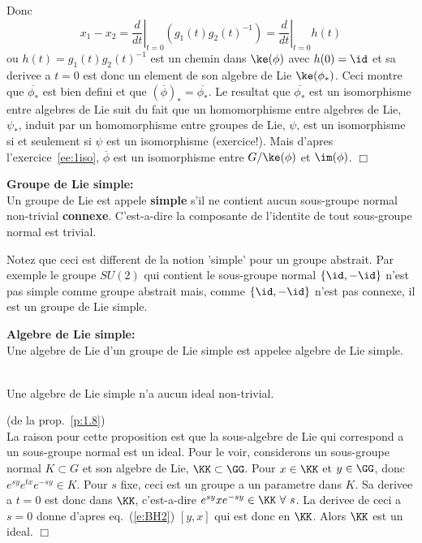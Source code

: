 \begin{prv}
Donc 
$$ x_1-x_2 = \left.\frac{d}{dt}\right|_{t=0}(g_1(t)g_2(t)^{-1}) = \left.\frac{d}{dt}\right|_{t=0}h(t)$$
ou $h(t)=g_1(t)g_2(t)^{-1}$ est un chemin dans $\ke(\phi)$ avec $h(0)=\id$ et sa derivee a $t=0$
est donc un element de son algebre de Lie $\ke(\phi_*)$. Ceci montre que $\overline{\phi_*}$ est bien
defini et que $(\overline\phi)_* = \overline{\phi_*}$. Le resultat que $\overline{\phi_*}$ est un isomorphisme 
entre algebres de Lie suit du fait que un homomorphisme entre algebres de Lie, $\psi_*$,
 induit par un homomorphisme entre groupes de  Lie, $\psi$, est un isomorphisme si et seulement si $\psi$ est 
 un isomorphisme (exercice!). Mais d'apres l'exercice~\ref{ee:1iso},  $\overline\phi$ est un isomorphisme entre
 $G/\ke(\phi)$ et $\im(\phi)$.
\hfill $\Box$
\end{prv}

\begin{ddd}{\bf Groupe de Lie simple:}\\
Un groupe de Lie est appele {\bf simple} s'il ne contient aucun 
sous-groupe normal  non-trivial {\bf connexe}.  C'est-a-dire la composante de l'identite de tout sous-groupe 
normal est trivial.~\label{d:Lie-simple}
\end{ddd}

Notez que ceci est different de la notion 'simple' pour un groupe abstrait.
Par exemple le groupe $SU(2)$ qui contient le sous-groupe normal $\{\id,
-\id\}$ n'est pas simple comme groupe abstrait mais, comme  $\{\id,
-\id\}$ n'est pas connexe, il est un groupe de Lie simple. 

\begin{ddd}{\bf Algebre de Lie simple:}\\
Une algebre de Lie d'un groupe de Lie simple est appelee algebre de Lie simple.
\end{ddd}

\begin{ppp}~ \label{p:1.8} \\
Une algebre de Lie simple n'a aucun ideal non-trivial.
\end{ppp}

\begin{prv} (de la prop.~\ref{p:1.8})\\
La raison pour cette proposition est que la sous-algebre de Lie qui correspond a
un sous-groupe normal est un ideal. Pour le voir, considerons un sous-groupe
normal $K\subset G $ et son algebre de Lie, $\KK\subset \GG$. Pour $x\in \KK$ et $y\in \GG$,
donc $e^{sy}e^{tx}e^{-sy} \in K$. Pour $s$ fixe, ceci est un groupe a un parametre dans
$K$. Sa derivee a $t=0$ est donc dans $\KK$, c'est-a-dire $e^{sy}xe^{-sy} \in 
\KK~\forall~s$. La derivee de ceci a $s=0$ donne d'apres eq.~(\ref{e:BH2})
$[y,x]$ qui est donc en $\KK$. Alors $\KK$ est un ideal. \hfill $\Box$
\end{prv}

